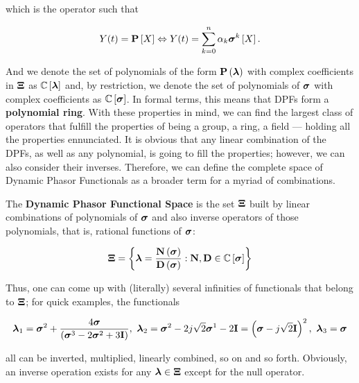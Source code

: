 	\noindent which is the operator such that

\begin{equation} Y(t) = \mathbf{P}\left[X\right] \Leftrightarrow Y(t) = \sum_{k=0}^n \alpha_k\boldsymbol{\sigma}^{k}\left[X\right] .\end{equation}

	And we denote the set of polynomials of the form $\mathbf{P}\left(\boldsymbol{\lambda}\right)$ with complex coefficients in $\boldsymbol{\Xi}$ as $\mathbb{C}\left[\boldsymbol{\lambda}\right]$ and, by restriction, we denote the set of polynomials of $\boldsymbol{\sigma}$ with complex coefficients as $\mathbb{C}\left[\boldsymbol{\sigma}\right]$. In formal terms, this means that DPFs form a \textbf{polynomial ring}. With these properties in mind, we can find the largest class of operators that fulfill the properties of being a group, a ring, a field — holding all the properties ennunciated. It is obvious that any linear combination of the DPFs, as well as any polynomial, is going to fill the properties; however, we can also consider their inverses. Therefore, we can define the complete space of Dynamic Phasor Functionals as a broader term for a myriad of combinations.

\begin{definition}\label{def:dpft_space}
	The \textbf{Dynamic Phasor Functional Space} is the set $\boldsymbol{\Xi}$ built by linear combinations of polynomials of $\boldsymbol{\sigma}$ and also inverse operators of those polynomials, that is, rational functions of $\boldsymbol{\sigma}$:

\begin{equation} \boldsymbol{\Xi} = \left\{\boldsymbol{\lambda} = \dfrac{\mathbf{N}\left(\boldsymbol{\sigma}\right)}{\mathbf{D}\left(\boldsymbol{\sigma}\right)}: \mathbf{N,D}\in\mathbb{C}\left[\boldsymbol{\sigma}\right]\right\} \end{equation}
\end{definition}

	Thus, one can come up with (literally) several infinities of functionals that belong to $\boldsymbol{\Xi}$; for quick examples, the functionals

\begin{equation} \boldsymbol{\lambda}_1 = \ndpo{2} + \dfrac{4\dpo}{\left(\ndpo{3} - 2\ndpo{2} + 3\mathbf{I}\right)},\ \boldsymbol{\lambda}_2 = \ndpo{2} - 2j\sqrt{2}\ndpo{1} - 2\mathbf{I} = \left(\dpo - j\sqrt{2}\mathbf{I}\right)^2,\ \boldsymbol{\lambda}_3 = \dpo \label{eq:dps_examples}\end{equation}

	\noindent all can be inverted, multiplied, linearly combined, so on and so forth. Obviously, an inverse operation exists for any $\boldsymbol{\lambda}\in\boldsymbol{\Xi}$ except for the null operator.


